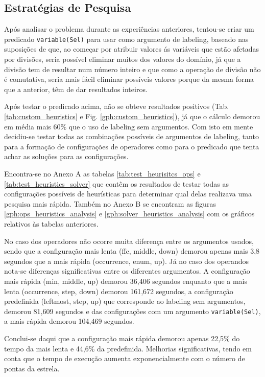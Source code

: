 \subsection{Estratégias de Pesquisa}

Após analisar o problema durante as experiências anteriores, tentou-se criar um predicado \verb|variable(Sel)| para usar como argumento de labeling, baseado nas suposições de que, ao começar por atribuir valores ás variáveis que estão afetadas por divisões, seria possível eliminar muitos dos valores do domínio, já que a divisão tem de resultar num número inteiro e que como a operação de divisão não é comutativa, seria mais fácil eliminar possíveis valores porque da mesma forma que a anterior, têm de dar resultados inteiros.

Após testar o predicado acima, não se obteve resultados positivos (Tab. \ref{tab:custom_heuristics} e Fig. \ref{gph:custom_heuristics}), já que o cálculo demorou em média mais 60\% que o uso de labeling sem argumentos. Com isto em mente decidiu-se testar todas as combinações possíveis de argumentos de labeling, tanto para a formação de configurações de operadores como para o predicado que tenta achar as soluções para as configurações.

Encontra-se no Anexo A as tabelas \ref{tab:test_heurisitcs_ops} e \ref{tab:test_heuristics_solver} que contêm os resultados de testar todas as configurações possíveis de heurísticas para determinar qual delas realizava uma pesquisa mais rápida. Também no Anexo B se encontram as figuras \ref{gph:ops_heuristics_analysis} e \ref{gph:solver_heuristics_analysis} com os gráficos relativos às tabelas anteriores.

No caso dos operadores não ocorre muita diferença entre os argumentos usados, sendo que a configuração mais lenta (ffc, middle, down) demorou apenas mais 3,8 segundos que a mais rápida (occurrence, enum, up). Já no caso dos operandos nota-se diferenças significativas entre os diferentes argumentos. A configuração mais rápida (min, middle, up) demorou 36,406 segundos enquanto que a mais lenta (occurrence, step, down) demorou 161,672 segundos, a configuração predefinida (leftmost, step, up) que corresponde ao labeling sem argumentos, demorou 81,609 segundos e das configurações com um argumento \verb|variable(Sel)|, a mais rápida demorou 104,469 segundos.

Conclui-se daqui que a configuração mais rápida demorou apenas 22,5\% do tempo da mais lenta e 44,6\% da predefinida. Melhorias significativas, tendo em conta que o tempo de execução aumenta exponencialmente com o número de pontas da estrela.

